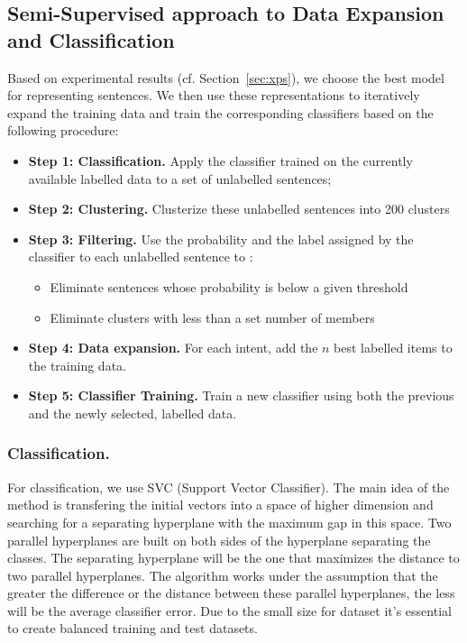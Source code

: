 \documentclass[11pt]{article}
\begin{document}
\subsection{Semi-Supervised approach to Data Expansion and Classification}
\label{subsec:dataexpansion}

Based on experimental results (cf. Section~\ref{sec:xps}), we choose
the best model for representing sentences. We then use these
representations to iteratively expand the training data and train the
corresponding classifiers based on the following procedure:


\begin{itemize}
\item \textbf{Step 1: Classification.} Apply the classifier trained on the currently available labelled data to a set of unlabelled sentences;
\item \textbf{Step 2: Clustering.} Clusterize these unlabelled sentences into 200 clusters
\item \textbf{Step 3: Filtering.} Use the probability and the label assigned by the classifier to each unlabelled sentence to :
  \begin{itemize}
\item Eliminate sentences whose probability is below a given threshold
\item Eliminate clusters with less than a set number of members
  \end{itemize}
\item \textbf{Step 4: Data expansion.} For each intent, add the $n$ best labelled items to the training data.
  \item \textbf{Step 5: Classifier Training.} Train a new classifier using both the previous and the newly selected, labelled data. 
\end{itemize}

\subsubsection{Classification.} For classification, we use SVC (Support Vector Classifier). The main idea of ​​the method is transfering the initial vectors into a space of higher dimension and searching for a separating hyperplane with the maximum gap in this space. Two parallel hyperplanes are built on both sides of the hyperplane separating the classes. The separating hyperplane will be the one that maximizes the distance to two parallel hyperplanes. The algorithm works under the assumption that the greater the difference or the distance between these parallel hyperplanes, the less will be the average classifier error.  Due to the small size for dataset it's essential to create balanced training and test datasets.
\end{document}

